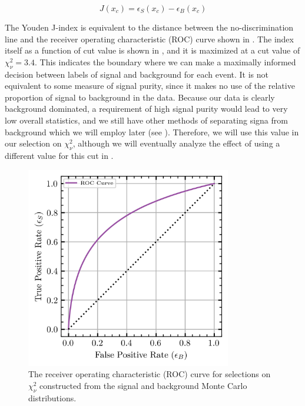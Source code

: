 \begin{equation}
  J(x_c) = \epsilon_S(x_c) - \epsilon_B(x_c)
  \label{eq:youden-j}
\end{equation}

The Youden J-index is equivalent to the distance between the no-discrimination line and the receiver operating characteristic (ROC) curve shown in . The index itself as a function of cut value is shown in , and it is maximized at a cut value of $\chi^2_\nu = 3.4$. This indicates the boundary where we can make a maximally informed decision between labels of signal and background for each event. It is not equivalent to some measure of signal purity, since it makes no use of the relative proportion of signal to background in the data. Because our data is clearly background dominated, a requirement of high signal purity would lead to very low overall statistics, and we still have other methods of separating signa from background which we will employ later (see ). Therefore, we will use this value in our selection on $\chi^2_\nu$, although we will eventually analyze the effect of using a different value for this cut in .

\begin{figure}
  \begin{center}
    \includegraphics[width=0.8\textwidth]{figures/data_combined_chisqdof_roc.png}
  \end{center}
  \caption{The receiver operating characteristic (ROC) curve for selections on $\chi^2_\nu$ constructed from the signal and background Monte Carlo distributions.}\label{fig:data-combined-chisqdof-roc}
\end{figure}

